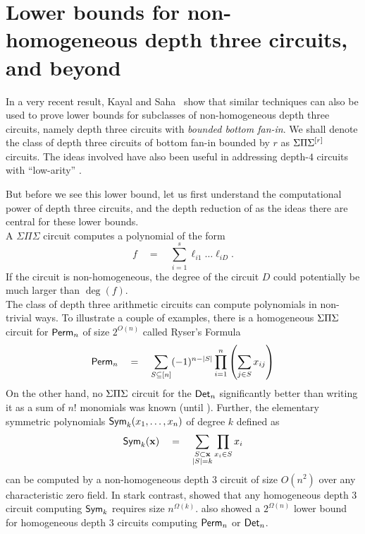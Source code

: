\chapter{Lower bounds for non-homogeneous depth three circuits, and beyond}

In a very recent result, Kayal and Saha~\cite{KayalSaha14} show that
similar techniques can also be used to prove lower bounds for
subclasses of non-homogeneous depth three circuits, namely depth three
circuits with \emph{bounded bottom fan-in}. 
We shall denote the class of depth three circuits of bottom fan-in
bounded by $r$ as $\Sigma\Pi\Sigma^{[r]}$ circuits. 
The ideas involved have also been useful in addressing depth-$4$
circuits with ``low-arity'' \cite{KumarSaraf15,KayalSaha15}.

But before we see this lower bound, let us first understand the
computational power of depth three circuits, and the depth reduction
of \cite{gkks13b} as the ideas there are central for these lower
bounds.\\


\noindent
A $\Sigma\Pi\Sigma$ circuit computes a polynomial of the form
\[
f\quad=\quad \sum_{i=1}^s \ell_{i1}\dots \ell_{iD}.
\]
If the circuit is non-homogeneous, the degree of the circuit $D$ could potentially be much larger than $\deg(f)$. \\

The class of depth three arithmetic circuits can compute polynomials
in non-trivial ways.
To illustrate a couple of examples, there is a homogeneous $\Sigma\Pi\Sigma$
circuit for $\mathsf{Perm}_n$ of size $2^{O(n)}$ called Ryser's Formula
\cite{rys63}
\begin{equation}\label{eqn:ryser}
\mathsf{Perm}_n \quad = \quad \sum_{S \subseteq[n]} (-1)^{n - |S|} \prod_{i=1}^n \left(\sum_{j\in S} x_{ij}\right)
\end{equation}
On the other hand, no $\Sigma\Pi\Sigma$ circuit for the $\mathsf{Det}_n$ significantly
better than writing it as a sum of $n!$ monomials was known (until
\cite{gkks13b}). 
Further, the elementary symmetric polynomials $\mathsf{Sym}_k(x_1,\dots,
x_n)$ of degree $k$ defined as
\[
\mathsf{Sym}_k(\mathbf{x}) \quad = \quad \sum_{\substack{S\subset \mathbf{x}\\|S| = k}} \prod_{x_i\in S}x_i
\]
can be computed by a non-homogeneous depth $3$ circuit of size
$O(n^2)$ over any characteristic zero field.
In stark contrast, \cite{nw1997} showed that any homogeneous depth $3$
circuit computing $\mathsf{Sym}_k$ requires size
$n^{\Omega(k)}$. \cite{nw1997} also showed a $2^{\Omega(n)}$ lower
bound for homogeneous depth $3$ circuits computing $\mathsf{Perm}_n$ or
$\mathsf{Det}_n$. 

